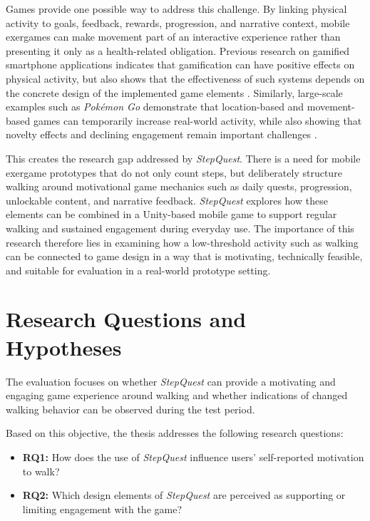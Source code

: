 Games provide one possible way to address this challenge. By linking physical activity to goals, feedback, rewards, progression, and narrative context, mobile exergames can make movement part of an interactive experience rather than presenting it only as a health-related obligation. Previous research on gamified smartphone applications indicates that gamification can have positive effects on physical activity, but also shows that the effectiveness of such systems depends on the concrete design of the implemented game elements \cite{Yang2022GamifiedAppsPA}. Similarly, large-scale examples such as \textit{Pokémon Go} demonstrate that location-based and movement-based games can temporarily increase real-world activity, while also showing that novelty effects and declining engagement remain important challenges \cite{Althoff2016PokemonGo,Wang2021PokemonGoReview}.

This creates the research gap addressed by \textit{StepQuest}. There is a need for mobile exergame prototypes that do not only count steps, but deliberately structure walking around motivational game mechanics such as daily quests, progression, unlockable content, and narrative feedback. \textit{StepQuest} explores how these elements can be combined in a Unity-based mobile game to support regular walking and sustained engagement during everyday use. The importance of this research therefore lies in examining how a low-threshold activity such as walking can be connected to game design in a way that is motivating, technically feasible, and suitable for evaluation in a real-world prototype setting.

\section{Research Questions and Hypotheses}

The evaluation focuses on whether \textit{StepQuest} can provide a motivating and engaging game experience around walking and whether indications of changed walking behavior can be observed during the test period.

Based on this objective, the thesis addresses the following research questions:

\begin{itemize}
	\item \textbf{RQ1:} How does the use of \textit{StepQuest} influence users' self-reported motivation to walk?
	
	\item \textbf{RQ2:} Which design elements of \textit{StepQuest} are perceived as supporting or limiting engagement with the game?
\end{itemize}

